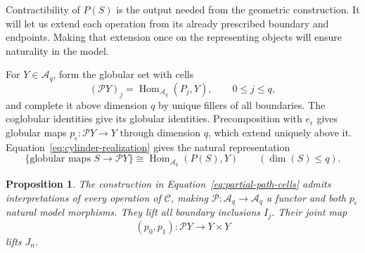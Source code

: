 \documentclass[11pt,letterpaper]{article}
\numberwithin{equation}{section}
\theoremstyle{plain}
\newtheorem{proposition}[theorem]{Proposition}
\theoremstyle{definition}
\theoremstyle{remark}
\DeclareMathOperator{\Hom}{Hom}
\begin{document}
Contractibility of \(P(S)\) is the output needed from the geometric
construction.  It will let us extend each operation from its already
prescribed boundary and endpoints.  Making that extension once on the
representing objects will ensure naturality in the model.

For \(Y\in\mathcal A_q\), form the globular set with cells
\begin{equation}\label{eq:partial-path-cells}
           (\mathcal P Y)_j=\Hom_{\mathcal A_q}(P_j,Y),
                     \qquad 0\le j\le q,
\end{equation}
and complete it above dimension \(q\) by unique fillers of all
boundaries.  The coglobular identities give its globular identities.
Precomposition with \(e_\epsilon\) gives globular maps
\(p_\epsilon:\mathcal P Y\to Y\) through dimension \(q\),
which extend uniquely above it.  Equation~\eqref{eq:cylinder-realization}
gives the natural representation
\begin{equation}\label{eq:partial-path-tuples}
 \{\text{globular maps }S\to\mathcal P Y\}
       \cong\Hom_{\mathcal A_q}(P(S),Y)
             \qquad(\dim(S)\le q).
\end{equation}

\begin{proposition}\label{prop:partial-path}
The construction in Equation~\eqref{eq:partial-path-cells} admits
interpretations of every operation of \(\mathcal C\), making
\(\mathcal P:\mathcal A_q\to\mathcal A_q\) a functor and
both \(p_\epsilon\) natural model morphisms.  They lift all
boundary inclusions \(I_j\).  Their joint map
\[
              (p_0,p_1):\mathcal P Y\longrightarrow Y\times Y
\]
lifts \(J_n\).
\end{proposition}
\end{document}
